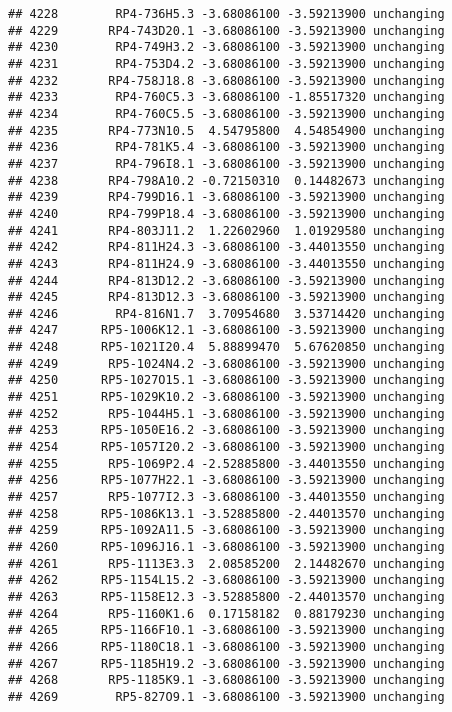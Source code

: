 \documentclass[]{article}
\begin{document}
\begin{verbatim}
## 4228        RP4-736H5.3 -3.68086100 -3.59213900 unchanging
## 4229       RP4-743D20.1 -3.68086100 -3.59213900 unchanging
## 4230        RP4-749H3.2 -3.68086100 -3.59213900 unchanging
## 4231        RP4-753D4.2 -3.68086100 -3.59213900 unchanging
## 4232       RP4-758J18.8 -3.68086100 -3.59213900 unchanging
## 4233        RP4-760C5.3 -3.68086100 -1.85517320 unchanging
## 4234        RP4-760C5.5 -3.68086100 -3.59213900 unchanging
## 4235       RP4-773N10.5  4.54795800  4.54854900 unchanging
## 4236        RP4-781K5.4 -3.68086100 -3.59213900 unchanging
## 4237        RP4-796I8.1 -3.68086100 -3.59213900 unchanging
## 4238       RP4-798A10.2 -0.72150310  0.14482673 unchanging
## 4239       RP4-799D16.1 -3.68086100 -3.59213900 unchanging
## 4240       RP4-799P18.4 -3.68086100 -3.59213900 unchanging
## 4241       RP4-803J11.2  1.22602960  1.01929580 unchanging
## 4242       RP4-811H24.3 -3.68086100 -3.44013550 unchanging
## 4243       RP4-811H24.9 -3.68086100 -3.44013550 unchanging
## 4244       RP4-813D12.2 -3.68086100 -3.59213900 unchanging
## 4245       RP4-813D12.3 -3.68086100 -3.59213900 unchanging
## 4246        RP4-816N1.7  3.70954680  3.53714420 unchanging
## 4247      RP5-1006K12.1 -3.68086100 -3.59213900 unchanging
## 4248      RP5-1021I20.4  5.88899470  5.67620850 unchanging
## 4249       RP5-1024N4.2 -3.68086100 -3.59213900 unchanging
## 4250      RP5-1027O15.1 -3.68086100 -3.59213900 unchanging
## 4251      RP5-1029K10.2 -3.68086100 -3.59213900 unchanging
## 4252       RP5-1044H5.1 -3.68086100 -3.59213900 unchanging
## 4253      RP5-1050E16.2 -3.68086100 -3.59213900 unchanging
## 4254      RP5-1057I20.2 -3.68086100 -3.59213900 unchanging
## 4255       RP5-1069P2.4 -2.52885800 -3.44013550 unchanging
## 4256      RP5-1077H22.1 -3.68086100 -3.59213900 unchanging
## 4257       RP5-1077I2.3 -3.68086100 -3.44013550 unchanging
## 4258      RP5-1086K13.1 -3.52885800 -2.44013570 unchanging
## 4259      RP5-1092A11.5 -3.68086100 -3.59213900 unchanging
## 4260      RP5-1096J16.1 -3.68086100 -3.59213900 unchanging
## 4261       RP5-1113E3.3  2.08585200  2.14482670 unchanging
## 4262      RP5-1154L15.2 -3.68086100 -3.59213900 unchanging
## 4263      RP5-1158E12.3 -3.52885800 -2.44013570 unchanging
## 4264       RP5-1160K1.6  0.17158182  0.88179230 unchanging
## 4265      RP5-1166F10.1 -3.68086100 -3.59213900 unchanging
## 4266      RP5-1180C18.1 -3.68086100 -3.59213900 unchanging
## 4267      RP5-1185H19.2 -3.68086100 -3.59213900 unchanging
## 4268       RP5-1185K9.1 -3.68086100 -3.59213900 unchanging
## 4269        RP5-827O9.1 -3.68086100 -3.59213900 unchanging

\end{verbatim}
\end{document}
